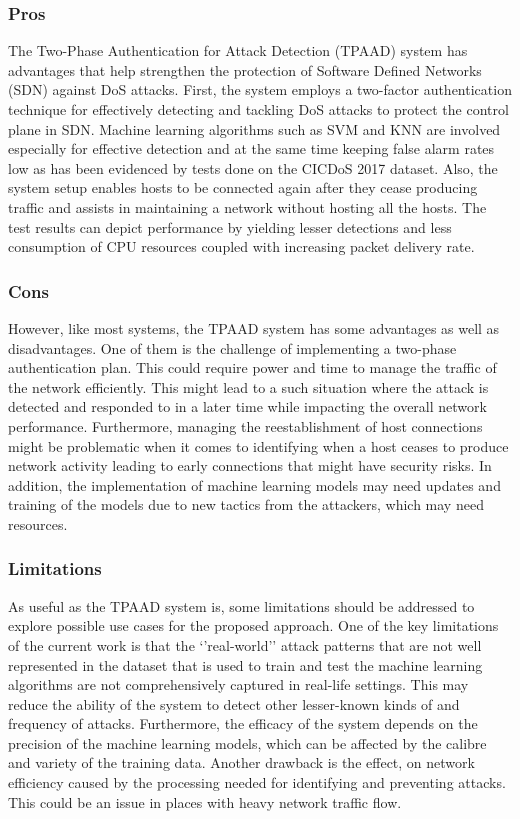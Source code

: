 \documentclass[a4paper, 12pt]{article}
\begin{document}
\subsubsection{Pros}
The Two-Phase Authentication for Attack Detection (TPAAD) system has advantages that help strengthen the protection of Software Defined Networks (SDN) against DoS attacks. First, the system employs a two-factor authentication technique for effectively detecting and tackling DoS attacks to protect the control plane in SDN. Machine learning algorithms such as SVM and KNN are involved especially for effective detection and at the same time keeping false alarm rates low as has been evidenced by tests done on the CICDoS 2017 dataset. Also, the system setup enables hosts to be connected again after they cease producing traffic and assists in maintaining a network without hosting all the hosts. The test results can depict performance by yielding lesser detections and less consumption of CPU resources coupled with increasing packet delivery rate. 
\subsubsection{Cons}
However, like most systems, the TPAAD system has some advantages as well as disadvantages. One of them is the challenge of implementing a two-phase authentication plan. This could require power and time to manage the traffic of the network efficiently. This might lead to a such situation where the attack is detected and responded to in a later time while impacting the overall network performance. Furthermore, managing the reestablishment of host connections might be problematic when it comes to identifying when a host ceases to produce network activity leading to early connections that might have security risks. In addition, the implementation of machine learning models may need updates and training of the models due to new tactics from the attackers, which may need resources.
\subsubsection{Limitations}
As useful as the TPAAD system is, some limitations should be addressed to explore possible use cases for the proposed approach. One of the key limitations of the current work is that the ‘’real-world’’ attack patterns that are not well represented in the dataset that is used to train and test the machine learning algorithms are not comprehensively captured in real-life settings. This may reduce the ability of the system to detect other lesser-known kinds of and frequency of attacks. Furthermore, the efficacy of the system depends on the precision of the machine learning models, which can be affected by the calibre and variety of the training data. Another drawback is the effect, on network efficiency caused by the processing needed for identifying and preventing attacks. This could be an issue in places with heavy network traffic flow.
\end{document}
